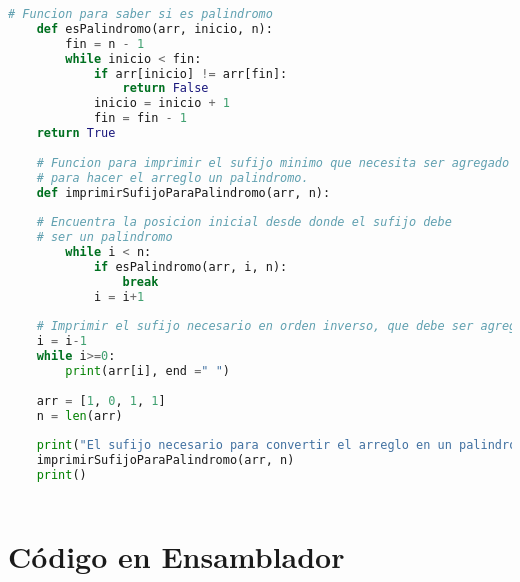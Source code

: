 \documentclass{article}
\begin{document}
	\begin{lstlisting}[language=Python, caption=Función  en Python]
	# Funcion para saber si es palindromo
	def esPalindromo(arr, inicio, n):
		fin = n - 1
		while inicio < fin:
			if arr[inicio] != arr[fin]:
				return False
			inicio = inicio + 1
			fin = fin - 1
	return True
	
	# Funcion para imprimir el sufijo minimo que necesita ser agregado al inicio 
	# para hacer el arreglo un palindromo.
	def imprimirSufijoParaPalindromo(arr, n):
	
	# Encuentra la posicion inicial desde donde el sufijo debe
	# ser un palindromo
		while i < n:
			if esPalindromo(arr, i, n):
				break
			i = i+1
	
	# Imprimir el sufijo necesario en orden inverso, que debe ser agregado al inicio
	i = i-1
	while i>=0:
		print(arr[i], end =" ")
	
	arr = [1, 0, 1, 1]
	n = len(arr)
	
	print("El sufijo necesario para convertir el arreglo en un palindromo es:", end=" ")
	imprimirSufijoParaPalindromo(arr, n)
	print()
		
	\end{lstlisting}
	
	\section{Código en Ensamblador}
	
\end{document}
